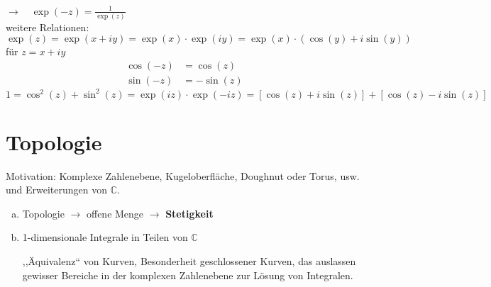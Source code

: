\begin{enumerate}[a)]
	$ \rightarrow \quad \exp(-z) = \frac{1}{\exp(z)} $\\[10pt]
	weitere Relationen:
	\begin{equation*}
	\exp(z) = \exp(x + i y) = \exp(x) \cdot \exp(iy) = \exp(x) \cdot (\cos(y) + i \sin(y))
	\end{equation*}
	für $ z = x + i y $
	\begin{align*}
	\cos(-z) &= \cos(z) \\
	\sin(-z) &= - \sin(z)
	\end{align*}
	\begin{equation*}
	1 = \cos^2(z) + \sin^2(z) = \exp(iz) \cdot \exp(-iz) = \left[\cos(z) + i \sin(z)\right] + \left[\cos(z) - i \sin(z)\right]
	\end{equation*}
\end{enumerate}

\section{Topologie}

Motivation: Komplexe Zahlenebene, Kugeloberfläche, Doughnut oder Torus, usw. und Erweiterungen von $ \mathbb{C} $.
\begin{enumerate}[a)]
	\item Topologie $ \rightarrow $ offene Menge $ \rightarrow $ \textbf{Stetigkeit}
	\item 1-dimensionale Integrale in Teilen von $ \mathbb{C} $
	
	
	\hft
	
	
	\noindent
	,,Äquivalenz`` von Kurven, Besonderheit geschlossener Kurven, das auslassen gewisser Bereiche in der komplexen Zahlenebene zur Lösung von Integralen.
\end{enumerate}




